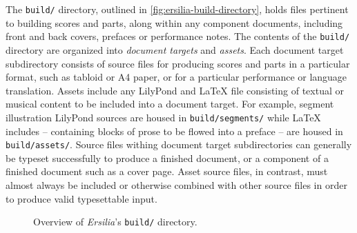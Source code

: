 The \texttt{build/} directory, outlined in
\autoref{fig:ersilia-build-directory}, holds files pertinent to building scores
and parts, along within any component documents, including front and back
covers, prefaces or performance notes. The contents of the \texttt{build/}
directory are organized into \emph{document targets} and \emph{assets}. Each
document target subdirectory consists of source files for producing scores and
parts in a particular format, such as tabloid or A4 paper, or for a particular
performance or language translation. Assets include any LilyPond and LaTeX file
consisting of textual or musical content to be included into a document target.
For example, segment illustration LilyPond sources are housed in
\texttt{build/segments/} while LaTeX includes -- containing blocks of prose to
be flowed into a preface  -- are housed in \texttt{build/assets/}. Source files
withing document target subdirectories can generally be typeset successfully to
produce a finished document, or a component of a finished document such as a
cover page. Asset source files, in contrast, must almost always be included or
otherwise combined with other source files in order to produce valid
typesettable input.

\begin{figure}[h!]
\begin{singlespacing}
\vspace{-0.5\baselineskip}
\end{singlespacing}
\caption{Overview of \emph{Ersilia}'s \texttt{build/} directory.}
\label{fig:ersilia-build-directory}
\end{figure}

